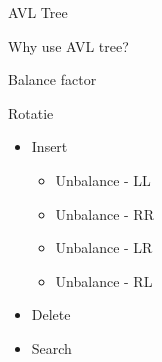 \begin{section}
    {AVL Tree}

Why use AVL tree?

Balance factor

Rotatie

\begin{itemize}
    \item Insert
    \begin{itemize}
        \item Unbalance - LL
        \item Unbalance - RR
        \item Unbalance - LR
        \item Unbalance - RL
    \end{itemize}
    \item Delete
    \item Search
\end{itemize}


\end{section}